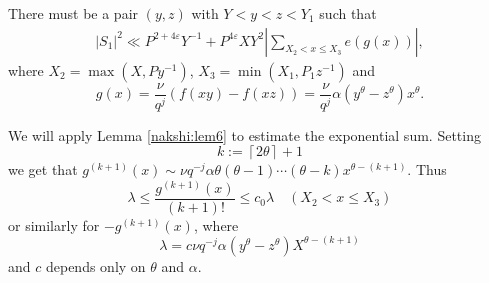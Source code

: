 \documentclass[a4paper,10pt]{amsart}
\numberwithin{equation}{section}
\theoremstyle{definition}
\theoremstyle{remark}
\newcommand{\lc}{\left\lceil}
\newcommand{\rc}{\right\rceil}
\renewcommand{\lvert}{\left\vert}
\renewcommand{\rvert}{\right\vert}
\begin{document}

There must be a pair $(y,z)$ with %
$Y<y<z<Y_1$ such that
\begin{gather}\label{mani:4.5}
\lvert S_1\rvert^2\ll  P^{2+4\varepsilon}Y^{-1}+P^{4\varepsilon}XY^2
  \lvert\sum_{X_2<x\leq X_3}e(g(x))\rvert,
\end{gather}
where $X_2=\max(X,Py^{-1})$, $X_3=\min(X_1,P_1z^{-1})$ and
\[
g(x)
=\frac{\nu}{q^j}\left(f(xy)-f(xz)\right)
=\frac{\nu}{q^j}\alpha(y^\theta-z^\theta)x^\theta.
\]

We will apply Lemma \ref{nakshi:lem6} to estimate the exponential
sum. Setting
\[k:=\lc 2\theta\rc+1
\]
we get that $g^{(k+1)}(x)\sim
\nu q^{-j}\alpha\theta(\theta-1)\cdots(\theta-k)x^{\theta-(k+1)}$.
Thus
\[
\lambda\leq\frac{g^{(k+1)}(x)}{(k+1)!}\leq c_0\lambda\quad(X_2<x\leq X_3)
\]
or similarly for $-g^{(k+1)}(x)$, where
\[
\lambda=c\nu q^{-j}\alpha(y^{\theta}-z^{\theta})X^{\theta-(k+1)}
\]
and $c$ depends only on $\theta$ and $\alpha$.
\end{document}
